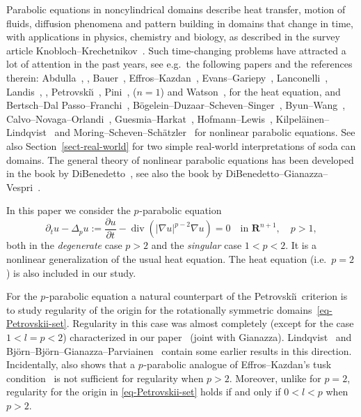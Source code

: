 \documentclass[a4paper, twoside]{article}
\theoremstyle{propositional}
\theoremstyle{descriptive}
\numberwithin{equation}{section}
\DeclareMathOperator{\Div}{div}
\newcommand{\R}{\mathbf{R}}
\newcommand{\p}{{$p\mspace{1mu}$}}
\begin{document}
Parabolic equations in noncylindrical domains describe heat transfer, motion of fluids,
diffusion phenomena and pattern building in domains that change in time, with
applications in physics, chemistry and biology, 
as described in the survey article Knobloch--Krechetnikov~\cite{KnoKre15}.
Such time-changing problems have attracted
a lot of attention in the past years, see e.g.\ the following papers
and  the references therein:
Abdulla~\cite{abdulla03}, \cite{abdulla05},
Bauer~\cite{Bauer62},
Effros--Kazdan~\cite{EfKaz}, Evans--Gariepy~\cite{EvGa},
Lanconelli~\cite{Lanc73},
Landis~\cite{Landis69}, \cite{Landis91},
Petrovski\u\i~\cite{Petro2},
Pini~\cite{pini1}, \cite{pini2} ($n=1$) 
and Watson~\cite{watson78}, \cite{watson}
for the heat equation, and
Bertsch--Dal Passo--Franchi~\cite{BeDPaFr}, 
B\"ogelein--Duzaar--Scheven--Singer~\cite{BogDuzScheSing18},
Byun--Wang~\cite{ByunWang05}, 
Calvo--Novaga--Orlandi~\cite{CaNoOr17},
Guesmia--Harkat~\cite{GueHar18},  
Hofmann--Lewis~\cite{HofLewis96},
Kilpel\"ainen--Lindqvist~\cite{KiLi96}  
and Moring--Scheven--Sch\"atzler~\cite{MSS}
 for nonlinear parabolic  equations.
See also Section~\ref{sect-real-world} for two 
simple  real-world interpretations of soda can domains.
The 
general theory of nonlinear parabolic equations has been developed in the book by 
DiBenedetto~\cite{DiBen93},
see also the book by
DiBenedetto--Gianazza--Vespri~\cite{DiBenGianVesp12}.

In this paper we consider  the  \p-parabolic equation
\begin{equation} \label{eq:para}
\partial_t u- \Delta_p u
    :=\frac{\partial u}{\partial t}- \Div(|\nabla u|^{p-2} \nabla u)
    =0
\quad \text{in } \R^{n+1},
\quad p>1,
\end{equation}
both in the \emph{degenerate} case $p>2$ and the \emph{singular} case $1<p<2$.
It is a nonlinear generalization of the usual heat equation.
The heat equation (i.e.\ $p=2$) is also included in our study.


For the \p-parabolic equation a natural counterpart of
the Petrovski\u\i\ criterion is to study regularity of the origin for 
the rotationally symmetric domains~\eqref{eq-Petrovskii-set}.
Regularity in this case 
was almost completely (except for the case $1<l=p<2$)
characterized
in our paper~\cite[Theorem~1.1]{BBG} (joint with Gianazza).
Lindqvist~\cite{lindqvist95} 
and Bj\"orn--Bj\"orn--Gianazza--Par\-vi\-ain\-en~\cite[Sections~6--7]{BBGP}
contain 
some earlier results in this direction.
Incidentally, \cite[Theorem~1.1]{BBG} also shows that a \p-parabolic
analogue of Effros--Kazdan's tusk condition~\cite{EfKaz}
is not sufficient for regularity when $p>2$.
Moreover, unlike for $p=2$, regularity 
for the origin
in \eqref{eq-Petrovskii-set} holds if and only if
$0<l<p$ when $p>2$.
\end{document}
